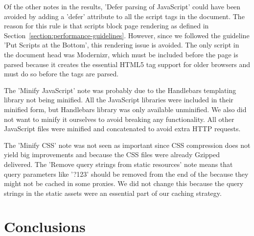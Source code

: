 Of the other notes in the results, 'Defer parsing of JavaScript' could
have been avoided by adding a 'defer' attribute to all the script tags
in the document. The reason for this rule is that scripts block page
rendering as defined in
Section~\ref{section:performance-guidelines}. However, since we
followed the guideline 'Put Scripts at the Bottom', this rendering
issue is avoided. The only script in the document head was Modernizr,
which must be included before the page is parsed because it creates
the essential HTML5 tag support for older browsers and must do so
before the tags are parsed.

The 'Minify JavaScript' note was probably due to the Handlebars
templating library not being minified. All the JavaScript libraries
were included in their minified form, but Handlebars library was only
available unminified. We also did not want to minify it ourselves to
avoid breaking any functionality. All other JavaScript files were
minified and concatenated to avoid extra HTTP requests.

The 'Minify CSS' note was not seen as important since CSS compression
does not yield big improvements and because the CSS files were already
Gzipped delivered. The 'Remove query strings from static resources'
note means that query parameters like '?123' should be removed from
the end of the  because they might not be cached in some
proxies. We did not change this because the query strings in the
static assets were an essential part of our caching strategy.

\section{Conclusions}
